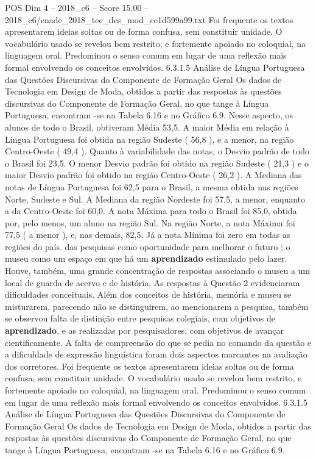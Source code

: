 \begin{textsample}{POS Dim 4 – 2018\_c6 – Score 15.00 – 2018\_c6/enade\_2018\_tec\_des\_mod\_ce1d599a99.txt}
Foi frequente os textos apresentarem ideias soltas ou de forma confusa, sem constituir unidade.
O vocabulário usado se revelou bem restrito, e fortemente apoiado no coloquial, na linguagem oral.
Predominou o senso comum em lugar de uma reflexão mais formal envolvendo os conceitos envolvidos. 6.3.1.5 Análise de Língua Portuguesa das Questões Discursivas do Componente de Formação Geral Os dados de Tecnologia em Design de Moda, obtidos a partir das respostas às questões discursivas do Componente de Formação Geral, no que tange à Língua Portuguesa, encontram -se na Tabela 6.16 e no Gráfico 6.9.
Nesse aspecto, os alunos de todo o Brasil, obtiveram Média 53,5.
A maior Média em relação à Língua Portuguesa foi obtida na região Sudeste ( 56,8 ), e a menor, na região Centro-Oeste ( 49,4 ).
Quanto à variabilidade das notas, o Desvio padrão de todo o Brasil foi 23,5.
O menor Desvio padrão foi obtido na região Sudeste ( 21,3 ) e o maior Desvio padrão foi obtido na região Centro-Oeste ( 26,2 ).
A Mediana das notas de Língua Portuguesa foi 62,5 para o Brasil, a mesma obtida nas regiões Norte, Sudeste e Sul.
A Mediana da região Nordeste foi 57,5, a menor, enquanto a da Centro-Oeste foi 60,0.
A nota Máxima para todo o Brasil foi 85,0, obtida por, pelo menos, um aluno na região Sul.
Na região Norte, a nota Máxima foi 77,5 ( a menor ), e, nas demais, 82,5.
Já a nota Mínima foi zero em todas as regiões do país. das pesquisas como oportunidade para melhorar o futuro ; o museu como um espaço em que há um \textbf{aprendizado} estimulado pelo lazer.
Houve, também, uma grande concentração de respostas associando o museu a um local de guarda de acervo e de história.
As respostas à Questão 2 evidenciaram dificuldades conceituais.
Além dos conceitos de história, memória e museu se misturarem, parecendo não se distinguirem, ao mencionarem a pesquisa, também se observou falta de distinção entre pesquisas colegiais, com objetivos de \textbf{aprendizado}, e as realizadas por pesquisadores, com objetivos de avançar cientificamente.
A falta de compreensão do que se pedia no comando da questão e a dificuldade de expressão linguística foram dois aspectos marcantes na avaliação dos corretores.
Foi frequente os textos apresentarem ideias soltas ou de forma confusa, sem constituir unidade.
O vocabulário usado se revelou bem restrito, e fortemente apoiado no coloquial, na linguagem oral.
Predominou o senso comum em lugar de uma reflexão mais formal envolvendo os conceitos envolvidos. 6.3.1.5 Análise de Língua Portuguesa das Questões Discursivas do Componente de Formação Geral Os dados de Tecnologia em Design de Moda, obtidos a partir das respostas às questões discursivas do Componente de Formação Geral, no que tange à Língua Portuguesa, encontram -se na Tabela 6.16 e no Gráfico 6.9.

\end{textsample}
